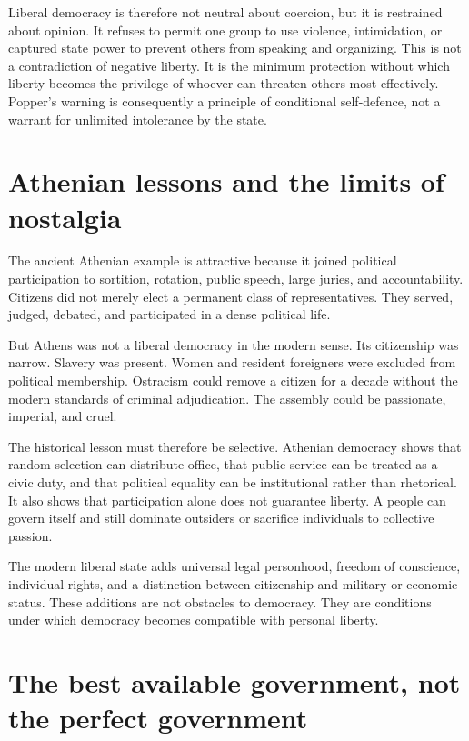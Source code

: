 ﻿\documentclass[12pt,a4paper]{book}
\begin{document}
Liberal democracy is therefore not neutral about coercion, but it is
restrained about opinion.  It refuses to permit one group to use violence,
intimidation, or captured state power to prevent others from speaking and
organizing.  This is not a contradiction of negative liberty.  It is the
minimum protection without which liberty becomes the privilege of whoever
can threaten others most effectively.  Popper's warning is consequently a
principle of conditional self-defence, not a warrant for unlimited
intolerance by the state.

\section{Athenian lessons and the limits of nostalgia}

The ancient Athenian example is attractive because it joined political
participation to sortition, rotation, public speech, large juries, and
accountability.  Citizens did not merely elect a permanent class of
representatives.  They served, judged, debated, and participated in a dense
political life.

But Athens was not a liberal democracy in the modern sense.  Its citizenship
was narrow.  Slavery was present.  Women and resident foreigners were
excluded from political membership.  Ostracism could remove a citizen for a
decade without the modern standards of criminal adjudication.  The assembly
could be passionate, imperial, and cruel.

The historical lesson must therefore be selective.  Athenian democracy
shows that random selection can distribute office, that public service can
be treated as a civic duty, and that political equality can be institutional
rather than rhetorical.  It also shows that participation alone does not
guarantee liberty.  A people can govern itself and still dominate outsiders
or sacrifice individuals to collective passion.

The modern liberal state adds universal legal personhood, freedom of
conscience, individual rights, and a distinction between citizenship and
military or economic status.  These additions are not obstacles to
democracy.  They are conditions under which democracy becomes compatible
with personal liberty.

\section{The best available government, not the perfect government}
\end{document}
